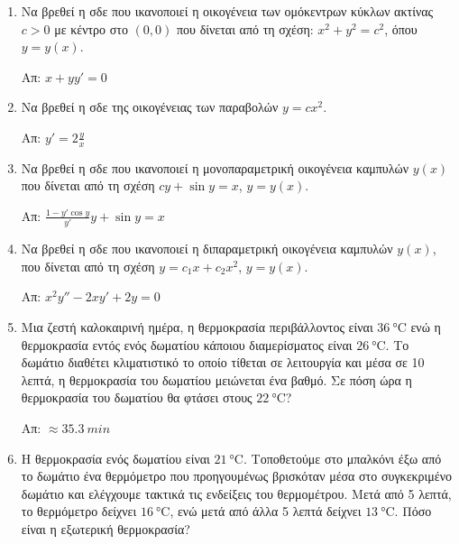 



\usepackage{microtype} 
\thispagestyle{empty}



\begin{center}
\end{center}

\vspace{\baselineskip}

\begin{enumerate}

	\item Να βρεθεί η σδε που ικανοποιεί η οικογένεια των ομόκεντρων κύκλων ακτίνας $c>0$ με κέντρο
		στο  $ (0,0) $ που δίνεται από τη σχέση:  $ x^{2} + y^{2} = c^{2} $,  όπου  $ y=y(x) $.

		\hfill Απ: $ x+yy'=0 $ 

	\item Να βρεθεί η σδε της οικογένειας των παραβολών $ y=cx^{2} $.

		\hfill Απ: $ y'=2 \frac{y}{x} $ 

	\item  Να βρεθεί η σδε που ικανοποιεί η μονοπαραμετρική οικογένεια καμπυλών  $ y(x) $ που
		δίνεται από τη σχέση  $ cy+ \sin{y} = x $, $ y=y(x) $.

		\hfill Απ: $ \frac{1-y' \cos{y}}{y'} y + \sin{y} = x $ 

	\item  Να βρεθεί η σδε που ικανοποιεί η διπαραμετρική οικογένεια καμπυλών $ y(x) $, που δίνεται
		από τη σχέση  $ y = c_{1}x + c_{2}x^{2} $, $y=y(x)$.

		\hfill Απ: $ x^{2}y''-2xy'+2y=0 $ 

	\item  Μια ζεστή καλοκαιρινή ημέρα, η θερμοκρασία περιβάλλοντος είναι $\SI{36}{\degreeCelsius}$
		 ενώ η θερμοκρασία εντός ενός δωματίου κάποιου διαμερίσματος είναι  $
		 \SI{26}\degreeCelsius{} $.  Το δωμάτιο διαθέτει κλιματιστικό το οποίο τίθεται σε λειτουργία
		 και μέσα σε 10 λεπτά, η θερμοκρασία του δωματίου μειώνεται ένα βαθμό. Σε πόση ώρα η
		 θερμοκρασία του δωματίου θα φτάσει στους  $\SI{22}{\degreeCelsius}$?

		 \hfill Απ:  $\approx \SI{35,3}{min}$

	 \item Η θερμοκρασία ενός δωματίου είναι $\SI{21}{\degreeCelsius}$. Τοποθετούμε στο μπαλκόνι έξω
		 από το δωμάτιο ένα θερμόμετρο που προηγουμένως βρισκόταν μέσα στο συγκεκριμένο δωμάτιο και
		 ελέγχουμε τακτικά τις ενδείξεις του θερμομέτρου. Μετά από 5 λεπτά, το θερμόμετρο δείχνει
		 $\SI{16}{\degreeCelsius}$, ενώ μετά από άλλα 5 λεπτά δείχνει $\SI{13}{\degreeCelsius}$.
		 Πόσο είναι η εξωτερική θερμοκρασία? 


\end{enumerate}
